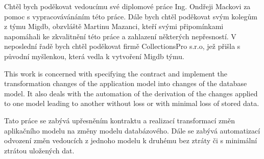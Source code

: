 \documentclass[11pt,twoside,a4paper]{book}
\begin{document}

\coverpagestarts


\acknowledgements
\noindent
Chtěl bych poděkovat vedoucímu své diplomové práce Ing. Ondřeji Mackovi za pomoc
s vypracovávánáním této práce. Dále bych chtěl poděkovat svým kolegům z týmu
Migdb, obzvláště Martinu Mazanci, kteří svými připomínkami napomáhali ke
zkvalitnění této práce a zahlazení některých nepřesností. V neposlední řadě
bych chtěl poděkovat firmě CollectionsPro s.r.o, jež přišla s původní
myšlenkou, která vedla k vytvoření Migdb týmu.





 
\abstractpage
\noindent 
This work is concerned with specifying the contract and implement the transformation changes 
of the application model into changes of the database model. It also
deals with the automation of the derivation of the changes applied to one model
leading to another without loss or with minimal loss of stored data.


\baselineskip

\noindent
Tato práce se zabývá upřesněním kontraktu a realizací transformací změn
aplikačního modelu na změny modelu databázového. Dále se zabývá automatizací
odvození změn vedoucích z jednoho modelu k druhému bez ztráty či s minimální
ztrátou uložených dat.

\noindent


\tableofcontents



\listoffigures


\end{document}
